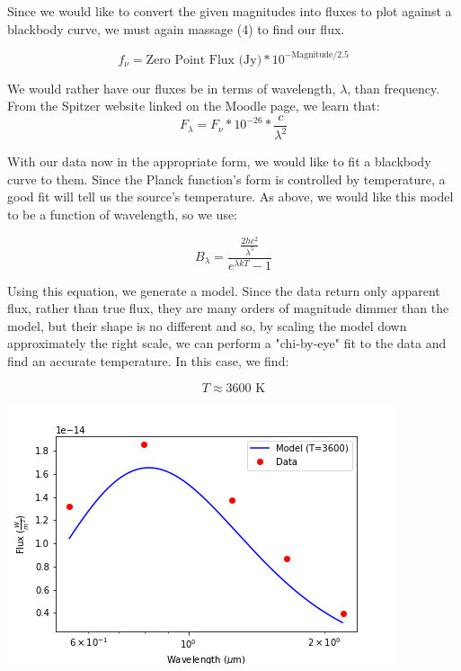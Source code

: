 \documentclass[12pt]{article}
\newenvironment{answer}[2][Answer]{\begin{trivlist}
\item[\hskip \labelsep {\bfseries #1}\hskip \labelsep {\bfseries #2.}]}{\end{trivlist}}
\begin{document}
\begin{answer}{3}

Since we would like to convert the given magnitudes into fluxes to plot against a blackbody curve, we must again massage (4) to find our flux.

\begin{equation}
  f_{\nu} = \text{Zero Point Flux (Jy)} * 10^{-\text{Magnitude}/2.5}
\end{equation}

We would rather have our fluxes be in terms of wavelength, $\lambda$, than frequency. From the Spitzer website linked on the Moodle page, we learn that:
\begin{equation}
  F_{\lambda} = F_{\nu} * 10^{-26} * \frac{c}{\lambda^{2}}
\end{equation}

With our data now in the appropriate form, we would like to fit a blackbody curve to them. Since the Planck function's form is controlled by temperature, a good fit will tell us the source's temperature. As above, we would like this model to be a function of wavelength, so we use:

\begin{equation}
  B_{\lambda} = \frac{\frac{2hc^{2}}{\lambda^{5}}}{e^{\lambda k T} - 1}
\end{equation}

Using this equation, we generate a model. Since the data return only apparent flux, rather than true flux, they are many orders of magnitude dimmer than the model, but their shape is no different and so, by scaling the model down approximately the right scale, we can perform a "chi-by-eye" fit to the data and find an accurate temperature. In this case, we find:

$$T \approx 3600 \text{ K} $$

\end{answer}

\bigskip
\bigskip

\includegraphics [scale=0.9] {prob3}
\end{document}
